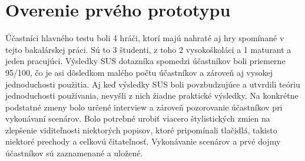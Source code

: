 \section*{Overenie prvého prototypu}



Účastníci hlavného testu boli 4 hráči, ktorí majú nahraté aj hry spomínané v tejto bakalárskej práci. Sú to 3 študenti, z toho 2 vysokoškoláci a 1 maturant a jeden pracujúci. Výsledky SUS dotazníka spomedzi účastníkov boli priemerne 95/100, čo je asi dôsledkom malého počtu účastníkov a zároveň aj vysokej jednoduchosti použitia. Aj keď výsledky SUS boli povzbudzujúce a utvrdili teóriu jednoduchosti používania, nevyšli z nich žiadne praktické výsledky. Na konkrétne podstatné zmeny bolo určené interview a zároveň pozorovanie účastníkov pri vykonávaní scenárov. Bolo potrebné urobiť viacero štylistických zmien na zlepšenie viditeľnosti niektorých popisov, ktoré pripomínali tlačidlá, takisto niektoré prechody a celkovú čitateľnosť. Vykonávanie scenárov a prvé dojmy účastníkov sú zaznamenané a uložené.
